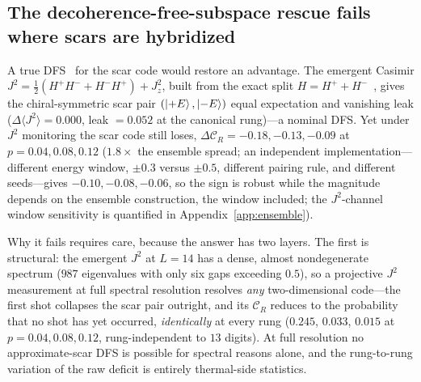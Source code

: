 \documentclass[aps,prb,twocolumn]{revtex4-2}
\newcommand{\CR}{\mathcal{C}_R}
\begin{document}
\subsection{The decoherence-free-subspace rescue fails where scars are
hybridized}
\label{sec:dfs}
A true DFS~\cite{Zanardi1997,Lidar1998} for the scar code would restore an
advantage. The emergent Casimir
$J^2=\tfrac12(H^+H^-+H^-H^+)+J_z^2$, built from the exact split
$H=H^++H^-$~\cite{Choi2019},
gives the chiral-symmetric scar pair $(\ket{+E},\ket{-E})$ equal expectation and
vanishing leak ($\Delta\langle J^2\rangle=0.000$, leak $=0.052$ at the
canonical rung)---a nominal DFS.
Yet under $J^2$ monitoring the scar code still loses, $\Delta\CR=-0.18,-0.13,
-0.09$ at $p=0.04,0.08,0.12$ ($1.8\times$ the ensemble spread; an independent
implementation---different energy window, $\pm0.3$ versus $\pm0.5$, different
pairing rule, and different seeds---gives $-0.10,-0.08,-0.06$, so the sign is
robust while the magnitude depends on the ensemble construction, the window
included; the $J^2$-channel window sensitivity is quantified in
Appendix~\ref{app:ensemble}).

Why it fails requires care, because the answer has two layers. The first is
structural: the emergent $J^2$ at $L=14$ has a dense, almost nondegenerate
spectrum ($987$ eigenvalues with only six gaps exceeding $0.5$), so a
projective $J^2$ measurement at full spectral resolution resolves \emph{any}
two-dimensional code---the first shot collapses the scar pair outright, and
its $\CR$ reduces to the probability that no shot has yet occurred,
\emph{identically} at every rung ($0.245$, $0.033$, $0.015$ at
$p=0.04,0.08,0.12$, rung-independent to $13$ digits). At full resolution no
approximate-scar DFS is possible for spectral reasons alone, and the
rung-to-rung variation of the raw deficit is entirely thermal-side
statistics.
\end{document}
